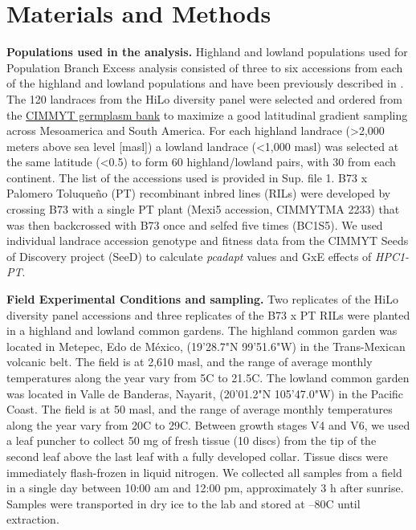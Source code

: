 \documentclass[9pt,twocolumn,twoside,lineno]{BioRxiv}
\begin{document}
\section{Materials and Methods}
\label{sec:materials:methods}
\textbf{Populations used in the analysis.} 
Highland and lowland populations used for Population Branch Excess analysis consisted of three to six accessions from each of the highland and lowland populations and have been previously described in \cite{Wang2020-mp, Wang2017-bc}. 
The 120 landraces from the HiLo diversity panel were selected and ordered from the \href{http://mgb.cimmyt.org/gringlobal/search.aspx}{CIMMYT germplasm bank} to maximize a good latitudinal gradient sampling across Mesoamerica and South America. 
For each highland landrace (>2,000 meters above sea level [masl]) a lowland landrace (<1,000 masl) was selected at the same latitude (<0.5\degree) to form 60 highland/lowland pairs, with 30 from each continent. 
The list of the accessions used is provided in Sup. file 1.   
B73 x Palomero Toluqueño (PT) recombinant inbred lines (RILs) were developed by crossing B73 with a single PT plant (Mexi5 accession, CIMMYTMA 2233) that was then backcrossed with B73 once and selfed five times (BC1S5).  
We used  individual landrace accession genotype and fitness data from the CIMMYT Seeds of Discovery project (SeeD) \cite{Gates2019-xu} to calculate \textit{pcadapt} \cite{Luu2017-ws} values and GxE effects of \textit{HPC1-PT}.

\textbf{Field Experimental Conditions and sampling.} 
Two replicates of the HiLo diversity panel accessions and three replicates of the B73 x PT RILs were planted in a highland and lowland common gardens. 
The highland common garden was located in Metepec, Edo de México, (19'28.7"N 99'51.6"W) in the Trans-Mexican volcanic belt. 
The field is at 2,610 masl, and the range of average monthly temperatures along the year vary from 5\degree C to 21.5\degree C.  
The lowland common garden was located in Valle de Banderas, Nayarit, (20'01.2"N 105'47.0"W) in the Pacific Coast. 
The field is at 50 masl, and the range of average monthly temperatures along the year vary from 20\degree C to 29\degree C.
Between growth stages V4 and V6, we used a leaf puncher to collect 50 mg of fresh tissue (10 discs) from the tip of the second leaf above the last leaf with a fully developed collar. 
Tissue discs were immediately flash-frozen in liquid nitrogen. 
We collected all samples from a field in a single day between 10:00 am and 12:00 pm, approximately 3 h after sunrise.
Samples were transported in dry ice to the lab and stored at --80\degree C until extraction. 
\end{document}
